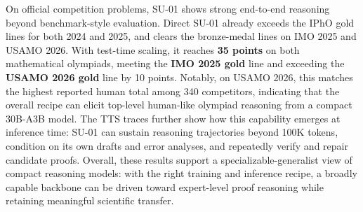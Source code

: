 On official competition problems, SU-01 shows strong end-to-end reasoning beyond benchmark-style evaluation. 
Direct SU-01 already exceeds the IPhO gold lines for
both 2024 and 2025, and clears the bronze-medal lines on IMO 2025 and USAMO 2026. 
With test-time scaling, it reaches \textbf{35 points} on both mathematical olympiads, meeting the \textbf{IMO
2025 gold} line and exceeding the \textbf{USAMO 2026 gold} line by 10 points. 
Notably, on USAMO 2026, this matches the highest reported human total among 340 competitors,
indicating that the overall recipe can elicit top-level human-like olympiad reasoning from a compact 30B-A3B model. 
The TTS traces further show how this
capability emerges at inference time: SU-01 can sustain reasoning trajectories beyond 100K tokens, condition on its own drafts and error analyses, and repeatedly
verify and repair candidate proofs. 
Overall, these results support a specializable-generalist view of compact reasoning
models: with the right training and inference recipe, a broadly capable backbone
can be driven toward expert-level proof reasoning while retaining meaningful
scientific transfer. 

 